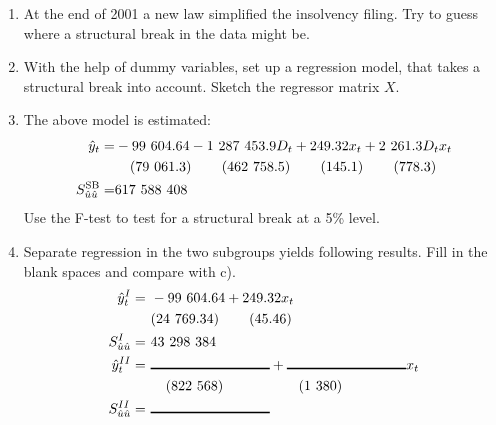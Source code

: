 \documentclass[captions=tableheading, 12pt, headings=small, parskip=half]{scrartcl}
\begin{document}
\begin{enumerate}[label = \alph*)]
	\item At the end of 2001 a new law simplified the insolvency filing. Try to guess where a structural break in the data might be.
	\item With the help of dummy variables, set up a regression model, that takes a structural break into account. Sketch the regressor matrix $X$.
	\item The above model is estimated:
	\begin{align*}
		\hat{y}_t =& -99\hphantom{i}604.64 - 1\hphantom{i}287\hphantom{i}453.9 D_t + 249.32 x_t + 2\hphantom{i}261.3 D_t x_t \\
		&\hphantom{M}(79\hphantom{i} 061.3)\hphantom{MM} (462\hphantom{i} 758.5) \hphantom{MM}(145.1)\hphantom{MM} (778.3)\\
		S_{\hat{u}\hat{u}}^{\text{SB}} =& 617\hphantom{i}588\hphantom{i}408
	\end{align*}
	Use the F-test to test for a structural break at a 5\% level.
	\item Separate regression in the two subgroups yields following results. Fill in the blank spaces and compare with c).
	\begin{align*}
	\hat{y}_t^I =&\hphantom{i} -99\hphantom{i} 604.64 + 249.32 x_t\\
	&\hphantom{i}(24 \hphantom{i}769.34)\hphantom{MM} (45.46)\\
	S_{\hat{u}\hat{u}}^I =&\hphantom{i} 43 \hphantom{i}298\hphantom{i} 384\\
	\hat{y}_t^{II} =&\hphantom{i} \rule{3cm}{1pt} + \rule{3cm}{1pt} x_t\\
	&\hphantom{iM} (822\hphantom{i}568) \hphantom{MMMMM}(1\hphantom{i}380)\\
	S_{\hat{u}\hat{u}}^{II} =&\hphantom{i} \rule{3cm}{1pt}
	\end{align*}
\end{enumerate}
\end{document}
